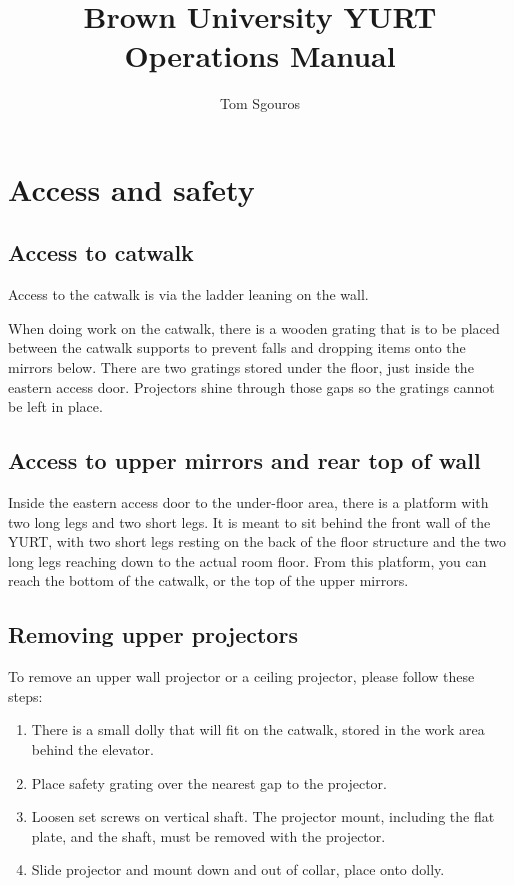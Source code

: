 \documentclass[11pt]{article}
\newcommand{\yurt}{YURT\xspace}
\begin{document}
\title{Brown University YURT Operations Manual}
\author{Tom Sgouros}
\maketitle

\tableofcontents

\setlength{\parskip}{10pt}
\setlength{\parindent}{0pt}

\section{Access and safety}

\subsection{Access to catwalk}

Access to the catwalk is via the ladder leaning on the wall.

When doing work on the catwalk, there is a wooden grating that is to
be placed between the catwalk supports to prevent falls and dropping
items onto the mirrors below.  There are two gratings stored under the
floor, just inside the eastern access door.  Projectors shine through
those gaps so the gratings cannot be left in place.

\subsection{Access to upper mirrors and rear top of wall}

Inside the eastern access door to the under-floor area, there is a
platform with two long legs and two short legs. It is meant to sit
behind the front wall of the \yurt, with two short legs resting on the
back of the floor structure and the two long legs reaching down to the
actual room floor.  From this platform, you can reach the bottom of
the catwalk, or the top of the upper mirrors.

\subsection{Removing upper projectors}

To remove an upper wall projector or a ceiling projector, please
follow these steps:

\begin{enumerate}
\item There is a small dolly that will fit on the catwalk, stored in
  the work area behind the elevator.

\item Place safety grating over the nearest gap to the projector.

\item Loosen set screws on vertical shaft.  The projector mount,
  including the flat plate, and the shaft, must be removed with the
  projector.

\item Slide projector and mount down and out of collar, place onto
  dolly.
\end{enumerate}
\end{document}
